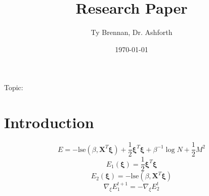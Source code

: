 \documentclass[letterpaper, 12pt]{article}
\title{Research Paper}
\author{Ty Brennan, Dr. Ashforth}
\date{\today}
\begin{document}
\maketitle
Topic: 
\section{Introduction}
\[E = -\text{lse}(\beta,\bm{X}^T\bm{\xi})+\frac 1 2 \bm{\xi}^T\bm{\xi} + \beta^{-1}\log{N} + \frac 1 2 M^2\]
\[E_1(\bm{\xi}) = \frac 1 2 \bm{\xi}^T\bm{\xi}\]
\[E_2(\bm{\xi}) = -\text{lse}(\beta, \bm{X}^T\bm{\xi})\]
\[\nabla_\xi E_1^{t+1} = -\nabla_\xi E_2^{t}\]
\end{document}
